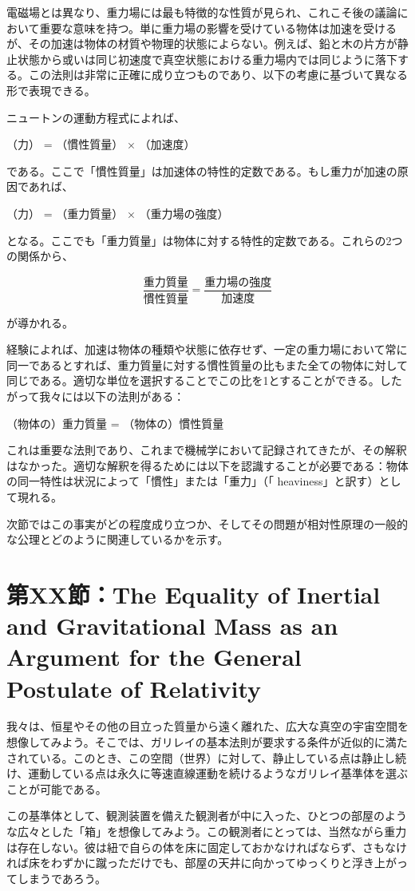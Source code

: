 \documentclass[a4paper,11pt,openany]{ltjsbook}
\begin{document}
電磁場とは異なり、重力場には最も特徴的な性質が見られ、これこそ後の議論において重要な意味を持つ。単に重力場の影響を受けている物体は加速を受けるが、その加速は物体の材質や物理的状態によらない。例えば、鉛と木の片方が静止状態から或いは同じ初速度で真空状態における重力場内では同じように落下する。この法則は非常に正確に成り立つものであり、以下の考慮に基づいて異なる形で表現できる。

ニュートンの運動方程式によれば、

（力） = （慣性質量） × （加速度）

である。ここで「慣性質量」は加速体の特性的定数である。もし重力が加速の原因であれば、

（力） = （重力質量） × （重力場の強度）

となる。ここでも「重力質量」は物体に対する特性的定数である。これらの2つの関係から、

\[
\frac{\text{重力質量}}{\text{慣性質量}} = \frac{\text{重力場の強度}}{\text{加速度}}
\]

が導かれる。

経験によれば、加速は物体の種類や状態に依存せず、一定の重力場において常に同一であるとすれば、重力質量に対する慣性質量の比もまた全ての物体に対して同じである。適切な単位を選択することでこの比を1とすることができる。したがって我々には以下の法則がある：

（物体の）重力質量 = （物体の）慣性質量

これは重要な法則であり、これまで機械学において記録されてきたが、その解釈はなかった。適切な解釈を得るためには以下を認識することが必要である：物体の同一特性は状況によって「慣性」または「重力」（「 heaviness」と訳す）として現れる。

次節ではこの事実がどの程度成り立つか、そしてその問題が相対性原理の一般的な公理とどのように関連しているかを示す。


\clearpage
\chapter{第XX節：The Equality of Inertial and Gravitational Mass as an Argument for the General Postulate of Relativity}

我々は、恒星やその他の目立った質量から遠く離れた、広大な真空の宇宙空間を想像してみよう。そこでは、ガリレイの基本法則が要求する条件が近似的に満たされている。このとき、この空間（世界）に対して、静止している点は静止し続け、運動している点は永久に等速直線運動を続けるようなガリレイ基準体を選ぶことが可能である。

この基準体として、観測装置を備えた観測者が中に入った、ひとつの部屋のような広々とした「箱」を想像してみよう。この観測者にとっては、当然ながら重力は存在しない。彼は紐で自らの体を床に固定しておかなければならず、さもなければ床をわずかに蹴っただけでも、部屋の天井に向かってゆっくりと浮き上がってしまうであろう。
\end{document}
